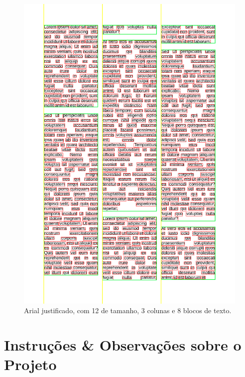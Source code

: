 \documentclass[english, 
               brazil, 
               bsc] %
               {dcomp-abntex2}
\begin{document}
\begin{figure}[h]
        \caption{\label{arial} \small Arial justificado, com 12 de tamanho, 3 colunas e 8 blocos de texto.}
        \begin{center}
            \includegraphics[scale=0.25]{./images/arial_justificado_tamanho_12_colunas_3_blocos_8_linhas_52_palavras_557.png}
        \end{center}
\end{figure}








\chapter{Instruções \& Observações sobre o Projeto}
\label{ch-notas}
\end{document}
